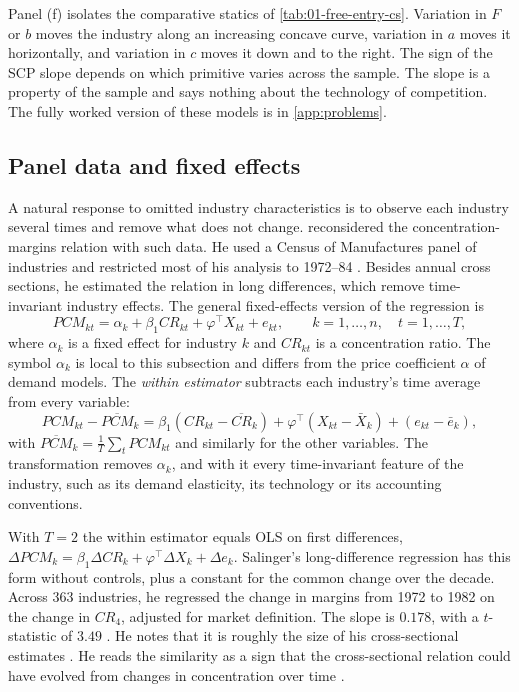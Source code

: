 Panel (f) isolates the comparative statics of \cref{tab:01-free-entry-cs}. Variation in $F$ or $b$ moves
the industry along an increasing concave curve, variation in $a$ moves it horizontally, and variation in
$c$ moves it down and to the right. The sign of the SCP slope depends on which primitive varies across
the sample. The slope is a property of the sample and says nothing about the technology of competition.
The fully
worked version of these models is in \cref{app:problems}.

\subsection{Panel data and fixed effects}\label{sec:01-salinger}

A natural response to omitted industry characteristics is to observe each industry several times and
remove what does not change. \citet{Salinger1990} reconsidered the concentration-margins relation with such
data. He used a Census of Manufactures panel of industries and restricted most of his analysis to
1972--84 \citep[p.~301]{Salinger1990}. Besides annual cross sections, he estimated the relation in long
differences, which remove time-invariant industry effects. The general fixed-effects version of the
regression is
\begin{equation}\label{eq:01-salinger}
\mathit{PCM}_{kt} = \alpha_k + \beta_1 \mathit{CR}_{kt} + \varphi^\top X_{kt} + e_{kt},
\qquad k = 1, \dots, n, \quad t = 1, \dots, T,
\end{equation}
where $\alpha_k$ is a fixed effect for industry $k$ and $\mathit{CR}_{kt}$ is a concentration ratio. The symbol
$\alpha_k$ is local to this subsection and differs from the price coefficient $\alpha$ of demand models. The
\emph{within estimator} subtracts each industry's time average from every variable:
\[
\mathit{PCM}_{kt} - \overline{\mathit{PCM}}_k = \beta_1 (\mathit{CR}_{kt} - \overline{\mathit{CR}}_k)
 + \varphi^\top (X_{kt} - \bar X_k) + (e_{kt} - \bar e_k),
\]
with $\overline{\mathit{PCM}}_k = \frac{1}{T}\sum_t \mathit{PCM}_{kt}$ and similarly for the other
variables. The transformation removes $\alpha_k$, and with it every time-invariant feature of the
industry, such as its demand elasticity, its technology or its accounting conventions.

With $T = 2$ the within estimator equals OLS on first differences, $\Delta \mathit{PCM}_k = \beta_1
\Delta \mathit{CR}_k + \varphi^\top \Delta X_k + \Delta e_k$. Salinger's long-difference regression has this
form without controls, plus a constant for the common change over the decade. Across 363 industries, he regressed the
change in margins from 1972 to 1982 on the change in $\mathit{CR}_4$, adjusted for market definition. The
slope is $0.178$, with a $t$-statistic of $3.49$ \citep[Table~4, row~1]{Salinger1990}. He notes that it is
roughly the size of his cross-sectional estimates \citep[p.~310]{Salinger1990}. He reads the similarity as
a sign that the cross-sectional relation could have evolved from changes in concentration over time
\citep[pp.~310--311]{Salinger1990}.

